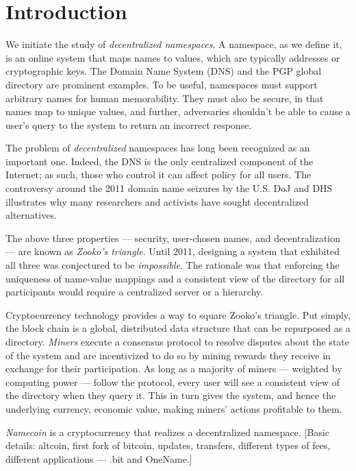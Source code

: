 \section{Introduction}
\label{sec:intro}

We initiate the study of {\em decentralized namespaces}. A namespace, as we define it, is an online system that maps names to values, which are typically addresses or cryptographic keys. The Domain Name System (DNS) and the PGP global directory are prominent examples. To be useful, namespaces must support arbitrary names for human memorability. They must also be secure, in that names map to unique values, and further, adversaries shouldn't be able to cause a user's query to the system to return an incorrect response.

The problem of {\em decentralized} namespaces has long been recognized as an important one. Indeed, the DNS is the only centralized component of the Internet; as such, those who control it can affect policy for all users. The controversy around the 2011 domain name seizures by the U.S. DoJ and DHS illustrates why many researchers and activists have sought decentralized alternatives.

The above three properties --- security, user-chosen names, and decentralization --- are known as {\em Zooko's triangle}. Until 2011, designing a system that exhibited all three was conjectured to be {\em impossible}. The rationale was that enforcing the uniqueness of name-value mappings and a consistent view of the directory for all participants would require a centralized server or a hierarchy.

Cryptocurrency technology provides a way to square Zooko's triangle. Put simply, the block chain is a global, distributed data structure that can be repurposed as a directory. {\em Miners} execute a consensus protocol to resolve disputes about the state of the system and are incentivized to do so by mining rewards they receive in exchange for their participation. As long as a majority of miners --- weighted by computing power --- follow the protocol, every user will see a consistent view of the directory when they query it. This in turn gives the system, and hence the underlying currency, economic value, making miners' actions profitable to them.

{\em Namecoin} is a cryptocurrency that realizes a decentralized namespace. [Basic details: altcoin, first fork of bitcoin, updates, transfers, different types of fees, different applications --- .bit and OneName.]

